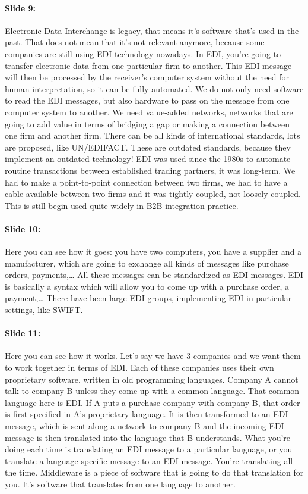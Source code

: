 \documentclass[10pt,a4paper]{report}
\begin{document}
\paragraph{Slide 9:}Electronic Data Interchange is legacy, that means it's software that's used in the past. That does not mean that it's not relevant anymore, because some companies are still using EDI technology nowadays. In EDI, you're going to transfer electronic data from one particular firm to another. This EDI message will then be processed by the receiver's computer system without the need for human interpretation, so it can be fully automated. We do not only need software to read the EDI messages, but also hardware to pass on the message from one computer system to another. We need value-added networks, networks that are going to add value in terms of bridging a gap or making a connection between one firm and another firm. There can be all kinds of international standards, lots are proposed, like UN/EDIFACT. These are outdated standards, because they implement an outdated technology! EDI was used since the 1980s to automate routine transactions between established trading partners, it was long-term. We had to make a point-to-point connection between two firms, we had to have a cable available between two firms and it was tightly coupled, not loosely coupled. This is still begin used quite widely in B2B integration practice.

\paragraph{Slide 10:}Here you can see how it goes: you have two computers, you have a supplier and a manufacturer, which are going to exchange all kinds of messages like purchase orders, payments,… All these messages can be standardized as EDI messages. EDI is basically a syntax which will allow you to come up with a purchase order, a payment,… There have been large EDI groups, implementing EDI in particular settings, like SWIFT.

\paragraph{Slide 11:}Here you can see how it works. Let's say we have 3 companies and we want them to work together in terms of EDI. Each of these companies uses their own proprietary software, written in old programming languages. Company A cannot talk to company B unless they come up with a common language. That common language here is EDI. If A puts a purchase company with company B, that order is first specified in A's proprietary language. It is then transformed to an EDI message, which is sent along a network to company B and the incoming EDI message is then translated into the language that B understands.
What you're doing each time is translating an EDI message to a particular language, or you translate a language-specific message to an EDI-message. You're translating all the time.
Middleware is a piece of software that is going to do that translation for you. It's software that translates from one language to another.
\end{document}
